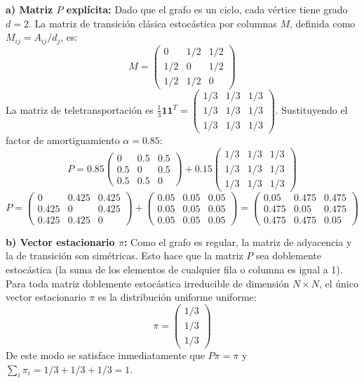 \textbf{a) Matriz $P$ explícita:}
Dado que el grafo es un ciclo, cada vértice tiene grado $d=2$. La matriz de transición clásica estocástica por columnas $M$, definida como $M_{ij} = A_{ij}/d_j$, es:
\begin{equation*}
M = \begin{pmatrix} 0 & 1/2 & 1/2 \\ 1/2 & 0 & 1/2 \\ 1/2 & 1/2 & 0 \end{pmatrix}
\end{equation*}
La matriz de teletransportación es $\frac{1}{3}\mathbf{1}\mathbf{1}^T = \begin{pmatrix} 1/3 & 1/3 & 1/3 \\ 1/3 & 1/3 & 1/3 \\ 1/3 & 1/3 & 1/3 \end{pmatrix}$.
Sustituyendo el factor de amortiguamiento $\alpha = 0.85$:
\begin{equation*}
P = 0.85 \begin{pmatrix} 0 & 0.5 & 0.5 \\ 0.5 & 0 & 0.5 \\ 0.5 & 0.5 & 0 \end{pmatrix} + 0.15 \begin{pmatrix} 1/3 & 1/3 & 1/3 \\ 1/3 & 1/3 & 1/3 \\ 1/3 & 1/3 & 1/3 \end{pmatrix}
\end{equation*}
\begin{equation*}
P = \begin{pmatrix} 0 & 0.425 & 0.425 \\ 0.425 & 0 & 0.425 \\ 0.425 & 0.425 & 0 \end{pmatrix} + \begin{pmatrix} 0.05 & 0.05 & 0.05 \\ 0.05 & 0.05 & 0.05 \\ 0.05 & 0.05 & 0.05 \end{pmatrix} = \begin{pmatrix} 0.05 & 0.475 & 0.475 \\ 0.475 & 0.05 & 0.475 \\ 0.475 & 0.475 & 0.05 \end{pmatrix}
\end{equation*}

\vspace{0.5cm}
\textbf{b) Vector estacionario $\pi$:}
Como el grafo es regular, la matriz de adyacencia y la de transición son simétricas. Esto hace que la matriz $P$ sea doblemente estocástica (la suma de los elementos de cualquier fila o columna es igual a 1). Para toda matriz doblemente estocástica irreducible de dimensión $N \times N$, el único vector estacionario $\pi$ es la distribución uniforme uniforme:
\begin{equation*}
\pi = \begin{pmatrix} 1/3 \\ 1/3 \\ 1/3 \end{pmatrix}
\end{equation*}
De este modo se satisface inmediatamente que $P\pi = \pi$ y $\sum_{i} \pi_i = 1/3 + 1/3 + 1/3 = 1$.

